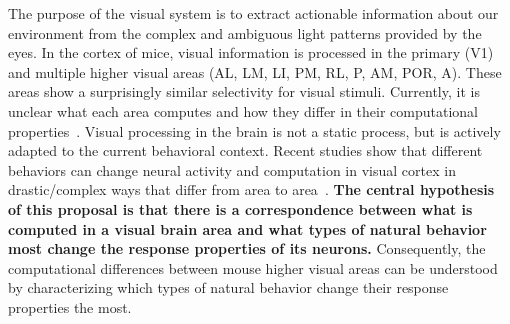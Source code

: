 The purpose of the visual system is to extract actionable information about our environment from the complex and ambiguous light patterns provided by the eyes. 
In the cortex of mice, visual information is processed in the primary (V1) and multiple higher visual areas (AL, LM, LI, PM, RL, P, AM, POR, A). 
These areas show a surprisingly similar selectivity for visual stimuli.
Currently, it is unclear what each area computes and how they differ in their computational properties~\parencite{Conwell2021-pw}. 
Visual processing in the brain is not a static process, but is actively adapted to the current behavioral context.
Recent studies show that different behaviors can change neural activity and computation in visual cortex in drastic/complex ways that differ from area to area~\parencite{Musall2019-kd,Stringer2019-lt,Franke2022-do}.
\textbf{The central hypothesis of this proposal is that there is a correspondence between what is computed in a visual brain area and what types of natural behavior most change the response properties of its neurons.} Consequently, the computational differences between mouse higher visual areas can be understood by characterizing which types of natural behavior change their response properties the most.


